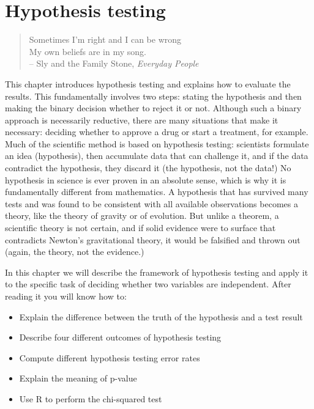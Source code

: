 \documentclass[
  letterpaper,
  DIV=11,
  numbers=noendperiod]{scrreprt}
\providecommand{\tightlist}{%
  \setlength{\itemsep}{0pt}\setlength{\parskip}{0pt}}\usepackage{longtable,booktabs,array}
\begin{document}

\hypertarget{hypothesis-testing}{%
\chapter{Hypothesis testing}\label{hypothesis-testing}}

\begin{quote}
Sometimes I'm right and I can be wrong\\
My own beliefs are in my song.\\
-- Sly and the Family Stone, \emph{Everyday People}
\end{quote}

This chapter introduces hypothesis testing and explains how to evaluate
the results. This fundamentally involves two steps: stating the
hypothesis and then making the binary decision whether to reject it or
not. Although such a binary approach is necessarily reductive, there are
many situations that make it necessary: deciding whether to approve a
drug or start a treatment, for example. Much of the scientific method is
based on hypothesis testing: scientists formulate an idea (hypothesis),
then accumulate data that can challenge it, and if the data contradict
the hypothesis, they discard it (the hypothesis, not the data!) No
hypothesis in science is ever proven in an absolute sense, which is why
it is fundamentally different from mathematics. A hypothesis that has
survived many tests and was found to be consistent with all available
observations becomes a theory, like the theory of gravity or of
evolution. But unlike a theorem, a scientific theory is not certain, and
if solid evidence were to surface that contradicts Newton's
gravitational theory, it would be falsified and thrown out (again, the
theory, not the evidence.)

In this chapter we will describe the framework of hypothesis testing and
apply it to the specific task of deciding whether two variables are
independent. After reading it you will know how to:

\begin{itemize}
\tightlist
\item
  Explain the difference between the truth of the hypothesis and a test
  result
\item
  Describe four different outcomes of hypothesis testing
\item
  Compute different hypothesis testing error rates
\item
  Explain the meaning of p-value
\item
  Use R to perform the chi-squared test
\end{itemize}
\end{document}
